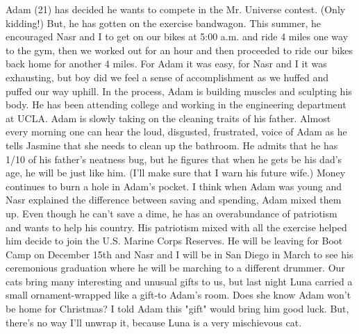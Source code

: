 Adam (21) has decided he wants to compete in the Mr. Universe contest. (Only kidding!)  But, he has gotten on the exercise bandwagon. This
summer, he encouraged Nasr and I to get on our bikes at 5:00 a.m. and ride 4 miles one way to the gym, then we worked out for an hour and then
proceeded to ride our bikes back home for another 4 miles.  For Adam it was easy, for Nasr and I it was exhausting, but boy did we feel a sense
of accomplishment as we huffed and puffed our way uphill.  In the process, Adam is building muscles and sculpting his body.  He has been
attending college and working in the engineering department at UCLA.   Adam is slowly taking on the cleaning traits of his father. Almost every
morning one can hear the loud, disgusted, frustrated, voice of Adam as he tells Jasmine that she needs to clean up the bathroom.  He admits that
he has 1/10 of his father's neatness bug, but he figures that when he gets be his dad's age, he will be just like him. (I'll make sure that I
warn his future wife.) Money continues to burn a hole in Adam's pocket. I think when Adam was young and Nasr explained the difference between
saving and spending, Adam mixed them up. Even though he can't save a dime, he has an overabundance of patriotism and wants to help his country.
His patriotism mixed with all the exercise helped him decide to join the U.S. Marine Corps Reserves.  He will be leaving for Boot Camp on
December 15th and Nasr and I will be in San Diego  in March to see his ceremonious graduation where he will be marching to a different drummer.
Our cats bring many interesting and unusual gifts to us, but last night Luna carried a small ornament-wrapped like a gift-to Adam's room.  Does
she know Adam won't be home for Christmas?  I told Adam this "gift" would bring him good luck. But, there's no way I'll unwrap it, because Luna
is a very mischievous cat.


